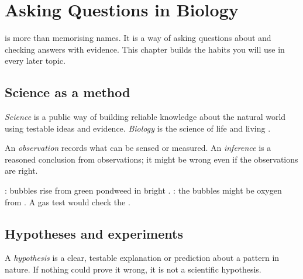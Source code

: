 \chapter{Asking Questions in Biology}\label{ch:g6:method}

 is more than memorising names. It is a way of asking questions
about  and checking answers with evidence. This chapter
builds the habits you will use in every later topic.

\section{Science as a method}

\begin{definition}\label{def:g6:method:science}
\emph{Science} is a public way of building reliable
knowledge about the natural world using testable ideas and evidence.
\emph{Biology} is the science of life and living
.
\end{definition}

\begin{definition}\label{def:g6:method:obs}
An \emph{observation} records what can be sensed or
measured. An \emph{inference} is a reasoned conclusion
from observations; it might be wrong even if the observations are
right.
\end{definition}

\begin{example}\label{ex:g6:method:bubbles}
: bubbles rise from green pondweed in bright .
: the bubbles might be oxygen from . A gas test
would check the .
\end{example}

\section{Hypotheses and experiments}

\begin{definition}[Hypothesis]\label{def:g6:method:hypothesis}
A \emph{hypothesis} is a clear, testable explanation
or prediction about a pattern in nature. If nothing could prove it
wrong, it is not a scientific hypothesis.
\end{definition}

